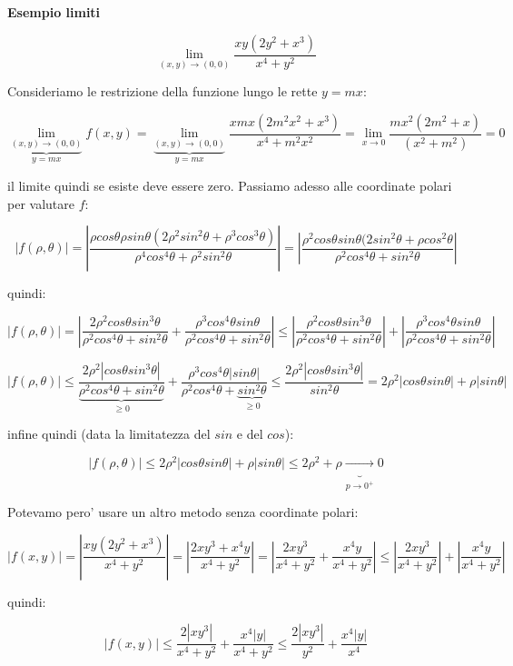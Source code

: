 \documentclass[11pt]{article}
\begin{document}
\textbf{Esempio limiti} 

\[
    \lim_{ (x,y) \to (0,0) } \frac{xy(2y^{2}+x^{3})}{x^{4}+y^{2}}
\]

Consideriamo le restrizione della funzione lungo le rette $y=mx$:


\[
    \underbrace{\lim_{ (x,y) \to (0,0) }}_{y=mx} f(x,y) = \underbrace{\lim_{ (x,y) \to (0,0) }}_{y=mx} \frac{xmx(2m^{2}x^{2}+x^{3})}{x^{4}+m^{2}x^{2}}= \lim_{ x \to 0 } \frac{mx^{2}(2m^{2}+x)}{(x^{2}+m^{2})} = 0
\]

il limite quindi se esiste deve essere zero. Passiamo adesso alle coordinate polari per valutare $f$:

\[
    |f(\rho, \theta)| = | \frac{\rho cos \theta \rho sin \theta (2 \rho^{2}sin^{2}\theta+\rho^{3}cos^{3}\theta)}{\rho^{4}cos^{4}\theta+\rho^{2}sin^{2}\theta}| = |\frac{\rho^{2}cos \theta sin \theta(2sin^{2}\theta+\rho cos^{2}\theta}{\rho^{2}cos^{4}\theta+sin^{2}\theta}|
\]

quindi:

\[
    |f(\rho, \theta)| = |\frac{2 \rho^{2}cos \theta sin^{3}\theta}{\rho^{2}cos^{4}\theta+sin^{2}\theta}+ \frac{\rho^{3}cos^{4}\theta sin \theta}{\rho^{2} cos^{4}\theta + sin^{2}\theta}| \le |\frac{\rho^{2}cos \theta sin^{3}\theta}{\rho^{2}cos^{4}\theta+sin^{2}\theta}| + |\frac{\rho^{3}cos^{4}\theta sin \theta}{\rho^{2} cos^{4}\theta + sin^{2}\theta}|
\]

\[
    |f(\rho, \theta)| \le \frac{2 \rho^{2} |cos \theta sin^{3} \theta|}{\underbrace{\rho^{2}cos^{4}\theta+sin^{2}\theta}_{\ge 0}} + \frac{\rho^{3}cos^{4}\theta|sin \theta|}{\rho^{2}cos^{4}\theta+\underbrace{sin^{2}\theta}_{\ge 0}} \le \frac{2 \rho^{2}|cos \theta sin^{3}\theta|}{sin^{2}\theta} = 2 \rho^{2} |cos \theta sin \theta| + \rho | sin \theta|
\]

infine quindi (data la limitatezza del $sin$ e del $cos$):

\[
 |f(\rho, \theta)| \le 2 \rho^{2} | cos \theta sin \theta| + \rho|sin \theta| \le 2 \rho^{2} + \rho \underbrace{\rightarrow}_{p \rightarrow 0^{+}} 0
\]


Potevamo pero' usare un altro metodo senza coordinate polari:

\[
    |f(x,y)|=  |\frac{xy(2y^{2}+x^{3})}{x^{4}+y^{2}}| = |\frac{2xy^{3}+x^{4}y}{x^{4}+y^{2}}| = | \frac{2xy^{3}}{x^{4}+y^{2}}+ \frac{x^{4}y}{x^{4}+y^{2}}| \le |\frac{2xy^{3}}{x^{4}+y^{2}}|+ |\frac{x^{4}y}{x^{4}+y^{2}}|
\]

quindi:

\[
   |f(x,y)|  \le \frac{2|xy^{3}|}{x^{4}+y^{2}} + \frac{x^{4}|y|}{x^{4}+y^{2}} \le \frac{2|xy^{3}|}{y^{2}} + \frac{x^{4}|y|}{x^{4}}
\]
\end{document}
